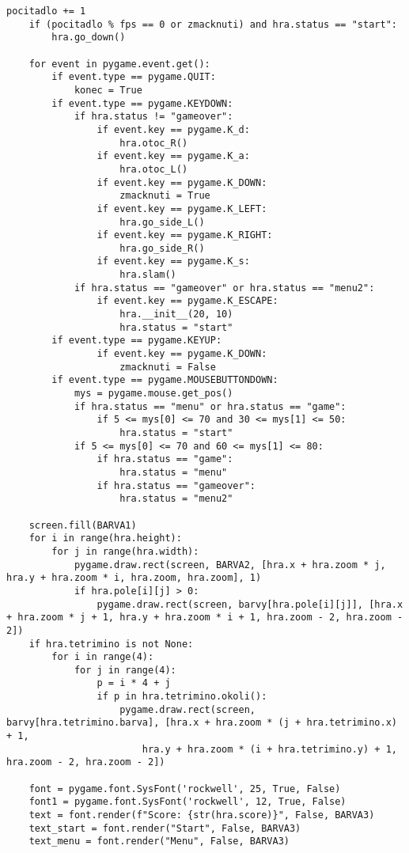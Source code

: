 \documentclass[12pt]{report}			%
\begin{document}
\begin{appendices}
\begin{lstlisting}[title={Program tetris.py}, caption={tetris.py}, 							label={lst:tetris.py}]
    pocitadlo += 1
    if (pocitadlo % fps == 0 or zmacknuti) and hra.status == "start":
        hra.go_down()

    for event in pygame.event.get():
        if event.type == pygame.QUIT:
            konec = True
        if event.type == pygame.KEYDOWN:
            if hra.status != "gameover":
                if event.key == pygame.K_d:
                    hra.otoc_R()
                if event.key == pygame.K_a:
                    hra.otoc_L()
                if event.key == pygame.K_DOWN:
                    zmacknuti = True
                if event.key == pygame.K_LEFT:
                    hra.go_side_L()
                if event.key == pygame.K_RIGHT:
                    hra.go_side_R()
                if event.key == pygame.K_s:
                    hra.slam()
            if hra.status == "gameover" or hra.status == "menu2":
                if event.key == pygame.K_ESCAPE:
                    hra.__init__(20, 10)
                    hra.status = "start"
        if event.type == pygame.KEYUP:
                if event.key == pygame.K_DOWN:
                    zmacknuti = False
        if event.type == pygame.MOUSEBUTTONDOWN:
            mys = pygame.mouse.get_pos()
            if hra.status == "menu" or hra.status == "game":
                if 5 <= mys[0] <= 70 and 30 <= mys[1] <= 50:
                    hra.status = "start"            
            if 5 <= mys[0] <= 70 and 60 <= mys[1] <= 80:
                if hra.status == "game":    
                    hra.status = "menu"
                if hra.status == "gameover":    
                    hra.status = "menu2"

    screen.fill(BARVA1)
    for i in range(hra.height):
        for j in range(hra.width):
            pygame.draw.rect(screen, BARVA2, [hra.x + hra.zoom * j, hra.y + hra.zoom * i, hra.zoom, hra.zoom], 1)
            if hra.pole[i][j] > 0:
                pygame.draw.rect(screen, barvy[hra.pole[i][j]], [hra.x + hra.zoom * j + 1, hra.y + hra.zoom * i + 1, hra.zoom - 2, hra.zoom - 2]) 
    if hra.tetrimino is not None:
        for i in range(4):
            for j in range(4):
                p = i * 4 + j
                if p in hra.tetrimino.okoli():
                    pygame.draw.rect(screen, barvy[hra.tetrimino.barva], [hra.x + hra.zoom * (j + hra.tetrimino.x) + 1,
                        hra.y + hra.zoom * (i + hra.tetrimino.y) + 1, hra.zoom - 2, hra.zoom - 2])

    font = pygame.font.SysFont('rockwell', 25, True, False)
    font1 = pygame.font.SysFont('rockwell', 12, True, False)
    text = font.render(f"Score: {str(hra.score)}", False, BARVA3)
    text_start = font.render("Start", False, BARVA3)
    text_menu = font.render("Menu", False, BARVA3)


\end{lstlisting}
\end{appendices}
\end{document}
